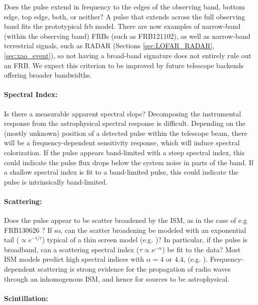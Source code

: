 \documentclass[a4paper,fleqn,usenatbib]{mnras}
\begin{document}
Does the pulse extend in frequency to the edges of the observing band, bottom
edge, top edge, both, or neither? A pulse that extends across the full observing
band fits the prototypical \gls{frb} model. There are now examples of
narrow-band (within the observing band) FRBs (such as FRB121102), as well as
narrow-band terrestrial signals, such as RADAR (Sections \ref{sec:LOFAR_RADAR},
\ref{sec:xao_event}), so not having a broad-band signature does not entirely
rule out an FRB. We expect this criterion to be improved by future telescope
backends offering broader bandwidths. 

\paragraph{Spectral Index:}

Is there a measurable apparent spectral slope? Decomposing the instrumental
response from the astrophysical spectral response is difficult.  Depending on
the (mostly unknown) position of a detected pulse within the telescope beam,
there will be a frequency-dependent sensitivity response, which will induce
spectral colorization.  If the pulse appears band-limited with a steep spectral
index, this could indicate the pulse flux drops below the system noise in parts
of the band. If a shallow spectral index is fit to a band-limited pulse, this
could indicate the pulse is intrinsically band-limited.

\paragraph{Scattering:}

Does the pulse appear to be scatter broadened by the ISM, as in the case of e.g
FRB130626 \cite{2016MNRAS.460L..30C}? If so, can the scatter broadening be
modeled with an exponential tail ($\propto e^{-t/\tau}$) typical of a thin
screen model (e.g. \citealt{Williamson1972})? In particular, if the pulse is
broadband, can a scattering spectral index ($\tau \propto \nu^{-\alpha}$) be fit
to the data? Most ISM models predict high spectral indices with $\alpha =4$ or
$4.4$, (e.g. \citealt{Rickett1977}). Frequency-dependent scattering is strong
evidence for the propagation of radio waves through an inhomogenous ISM, and
hence for sources to be astrophysical. 

\paragraph{Scintillation:}
\end{document}
